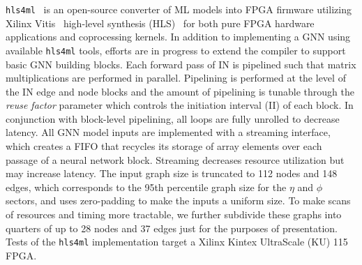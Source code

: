 \documentclass{article}
\newcommand{\hlsfml}{\texttt{hls4ml}\xspace}
\begin{document}
\hlsfml~\cite{Duarte:2018ite} is an open-source converter of ML models into FPGA firmware utilizing Xilinx Vitis~\cite{vitis20192} high-level synthesis (HLS)~\cite{vivadohls} for both pure FPGA hardware applications and coprocessing kernels. 
In addition to implementing a GNN using available \hlsfml tools, efforts are in progress to extend the compiler to support basic GNN building blocks.
Each forward pass of IN is pipelined such that matrix multiplications are performed in parallel. 
Pipelining is performed at the level of the IN edge and node blocks %
and the amount of pipelining is tunable through the \emph{reuse factor} parameter which controls the initiation interval (II) of each block.
In conjunction with block-level pipelining, all loops are fully unrolled to decrease latency.
All GNN model inputs are implemented with a streaming interface, which creates a FIFO that recycles its storage of array elements over each passage of a neural network block. 
Streaming decreases resource utilization but may increase latency. 
The input graph size is truncated to 112 nodes and 148 edges, which corresponds to the 95th percentile graph size for the $\eta$ and $\phi$ sectors, and uses zero-padding to make the inputs a uniform size.
To make scans of resources and timing more tractable, we further subdivide these graphs into quarters of up to 28 nodes and 37 edges just for the purposes of presentation.
Tests of the \hlsfml implementation target a Xilinx Kintex UltraScale (KU) 115 FPGA.
\end{document}
